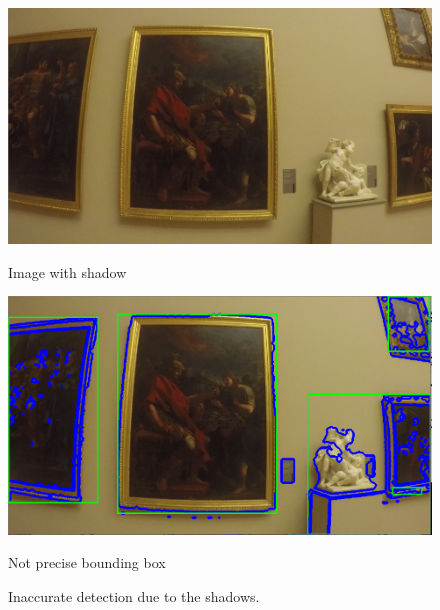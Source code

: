 \begin{figure}[h]
      \includegraphics[width=\linewidth]{pictures/painting_detection/detection_withoutNN_1.PNG}
      \caption*{Image with shadow}\label{fig:shadow1}
    \endminipage\hfill
      \includegraphics[width=\linewidth]{pictures/painting_detection/detection_withoutNN_3.PNG}
      \caption*{Not precise bounding box}\label{fig:shadow2}
    \endminipage\hfill
    \caption{Inaccurate detection due to the shadows.}\label{fig:innaccurate_detection}
\end{figure}







